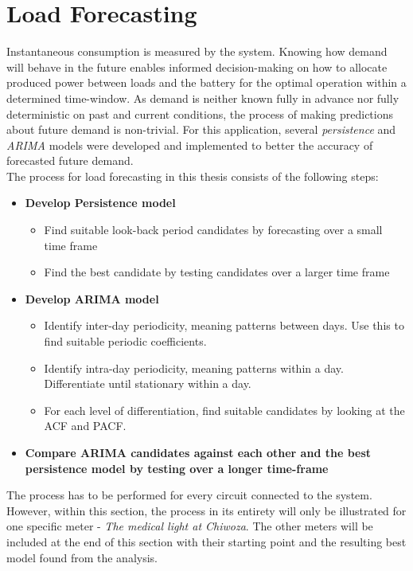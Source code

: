 \section{Load Forecasting }\label{seq:load_forecasting}

Instantaneous consumption is measured by the system. Knowing how demand will behave in the future enables informed decision-making on how to allocate produced power between loads and the battery for the optimal operation within a determined time-window. As demand is neither known fully in advance nor fully deterministic on past and current conditions, the process of making predictions about future demand is non-trivial. For this application, several \textit{persistence} and \textit{ARIMA} models were developed and implemented to better the accuracy of forecasted future demand.\\

The process for load forecasting in this thesis consists of the following steps:
\begin{itemize}
    \item \textbf{Develop Persistence model}
    \begin{itemize}
        \item Find suitable look-back period candidates by forecasting over a small time frame
        \item Find the best candidate by testing candidates over a larger time frame 
    \end{itemize}
    \item \textbf{Develop ARIMA model}
    \begin{itemize}
        \item Identify inter-day periodicity, meaning patterns between days. Use this to find suitable periodic coefficients.
        \item Identify intra-day periodicity, meaning patterns within a day. Differentiate until stationary within a day.
        \item For each level of differentiation, find suitable candidates by looking at the ACF and PACF.
    \end{itemize} 
    \item \textbf{Compare ARIMA candidates against each other and the best persistence model by testing over a longer time-frame}
\end{itemize}

The process has to be performed for every circuit connected to the system. However, within this section, the process in its entirety will only be illustrated for one specific meter - \textit{The medical light at Chiwoza}. The other meters will be included at the end of this section with their starting point and the resulting best model found from the analysis.\\

